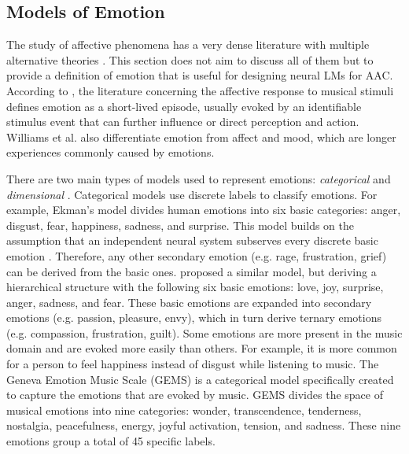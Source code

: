 \subsection{Models of Emotion}

The study of affective phenomena has a very dense literature with multiple alternative theories \cite{ekkekakis2013measurement}. This section does not aim to discuss all of them but to provide a definition of emotion that is useful for designing neural LMs for AAC.  According to \citet{williams2015investigating}, the literature concerning the affective response to musical stimuli defines emotion as a short-lived episode, usually evoked by an identifiable stimulus event that can further influence or direct perception and action. Williams et al. \cite{williams2015investigating} also differentiate emotion from affect and mood, which are longer experiences commonly caused by emotions.

There are two main types of models used to represent emotions: \emph{categorical} and \emph{dimensional} \cite{eerola2011comparison}. Categorical models use discrete labels to classify emotions. For example, Ekman's model \cite{ekman1992argument} divides human emotions into six basic categories: anger, disgust, fear, happiness, sadness, and surprise. This model builds on the assumption that an independent neural system subserves every discrete basic emotion \cite{eerola2011comparison}. Therefore, any other secondary emotion (e.g. rage, frustration, grief) can be derived from the basic ones. \citet{parrott2001emotions} proposed a similar model, but deriving a hierarchical structure with the following six basic emotions: love, joy, surprise, anger, sadness, and fear. These basic emotions are expanded into secondary emotions (e.g. passion, pleasure, envy), which in turn derive ternary emotions (e.g. compassion, frustration, guilt). Some emotions are more present in the music domain and are evoked more easily than others. For example, it is more common for a person to feel happiness instead of disgust while listening to music. The Geneva Emotion Music Scale (GEMS) \cite{zentner2008emotions} is a categorical model specifically created to capture the emotions that are evoked by music. GEMS divides the space of musical emotions into nine categories: wonder, transcendence, tenderness, nostalgia, peacefulness, energy, joyful activation, tension, and sadness. These nine emotions group a total of 45 specific labels.


